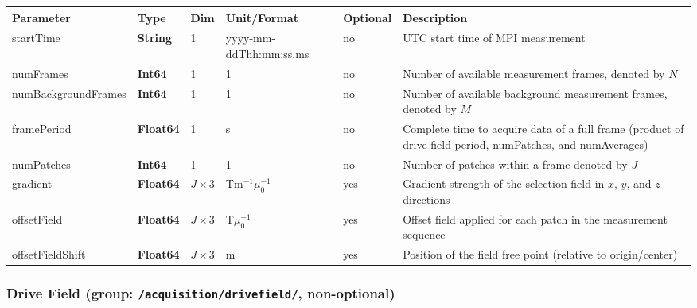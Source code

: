 \documentclass[landscape,a4paper]{article} %
\newcommand{\inl}[1]{\lstinline[columns=fixed]{#1}}
\newcommand{\inltab}[1]{{\ttfamily\bfseries\color{blue}#1}}
\newcommand{\inlvar}[1]{{\ttfamily#1}}
\begin{document}
\noindent \begin{tabularx}{\columnwidth}{lllllX} 
\textbf{Parameter} & \textbf{Type} & \textbf{Dim} & \textbf{Unit/Format} & \textbf{Optional} & \textbf{Description} \\ \hline 
\inlvar{startTime} & \inltab{String} & 1 & yyyy-mm-ddThh:mm:ss.ms & no & UTC start time of MPI measurement \\ \hline
\inlvar{numFrames} & \inltab{Int64} & 1 & 1 & no & Number of available measurement frames, denoted by $N$ \\ \hline
\inlvar{numBackgroundFrames} & \inltab{Int64} & 1 & 1 & no & Number of available background measurement frames, denoted by $M$ \\ \hline
\inlvar{framePeriod} & \inltab{Float64} & 1 & s & no & Complete time to acquire data of a full frame (product of drive field \inlvar{period}, \inlvar{numPatches}, and \inlvar{numAverages}) \\ \hline
\inlvar{numPatches} & \inltab{Int64} & 1 & 1 & no & Number of patches within a frame denoted by $J$ \\ \hline 
\inlvar{gradient} & \inltab{Float64} & $J \times 3$ & Tm$^{-1}\mu_0^{-1}$ & yes & Gradient strength of the selection field in $x$, $y$, and $z$ directions \\ \hline
\inlvar{offsetField} & \inltab{Float64} & $J \times 3$ & T$\mu_0^{-1}$ & yes & Offset field applied for each patch in the measurement sequence \\ \hline
\inlvar{offsetFieldShift} & \inltab{Float64} & $J \times 3$ & m & yes & Position of the field free point (relative to origin/center) \\ \hline
\end{tabularx}


\subsubsection{Drive Field (group: \inl{/acquisition/drivefield/}, non-optional)}
\end{document}
